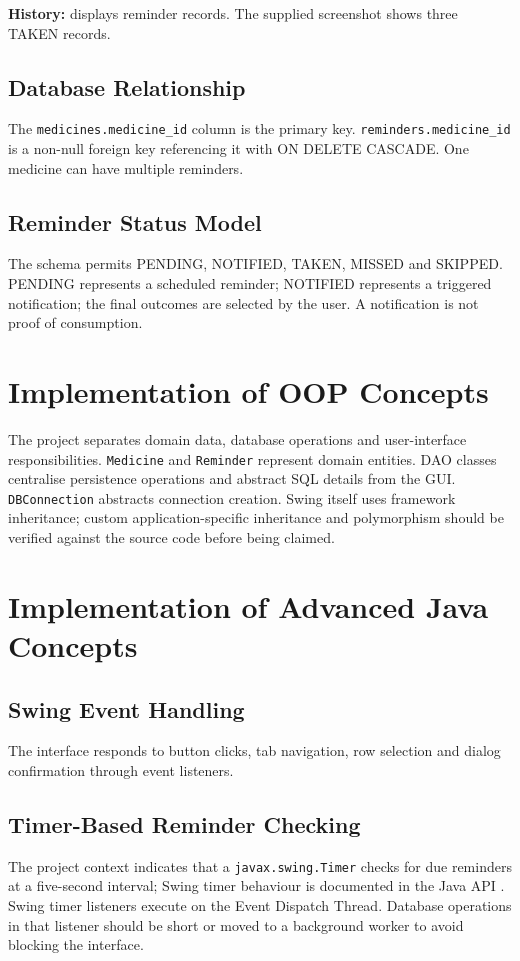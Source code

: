 \documentclass[12pt,a4paper,oneside]{report}
\begin{document}
\textbf{History:} displays reminder records. The supplied screenshot shows three TAKEN records.

\section{Database Relationship}
The \texttt{medicines.medicine\_id} column is the primary key. \texttt{reminders.medicine\_id} is a non-null foreign key referencing it with ON DELETE CASCADE. One medicine can have multiple reminders.

\section{Reminder Status Model}
The schema permits PENDING, NOTIFIED, TAKEN, MISSED and SKIPPED. PENDING represents a scheduled reminder; NOTIFIED represents a triggered notification; the final outcomes are selected by the user. A notification is not proof of consumption.

\chapter{Implementation of OOP Concepts}
The project separates domain data, database operations and user-interface responsibilities. \texttt{Medicine} and \texttt{Reminder} represent domain entities. DAO classes centralise persistence operations and abstract SQL details from the GUI. \texttt{DBConnection} abstracts connection creation. Swing itself uses framework inheritance; custom application-specific inheritance and polymorphism should be verified against the source code before being claimed.

\chapter{Implementation of Advanced Java Concepts}
\section{Swing Event Handling}
The interface responds to button clicks, tab navigation, row selection and dialog confirmation through event listeners.

\section{Timer-Based Reminder Checking}
The project context indicates that a \texttt{javax.swing.Timer} checks for due reminders at a five-second interval; Swing timer behaviour is documented in the Java API \cite{timer}. Swing timer listeners execute on the Event Dispatch Thread. Database operations in that listener should be short or moved to a background worker to avoid blocking the interface.
\end{document}
